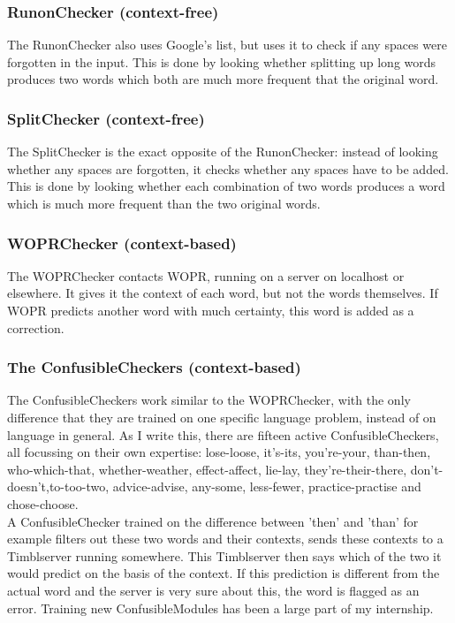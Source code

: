 \documentclass[12pt]{article}
\begin{document}
\subsubsection{RunonChecker (context-free)}
The RunonChecker also uses Google's list, but uses it to check if any spaces were forgotten in the input. This is done by looking whether splitting up long words produces two words which both are much more frequent that the original word.

\subsubsection{SplitChecker (context-free)}
The SplitChecker is the exact opposite of the RunonChecker: instead of looking whether any spaces are forgotten, it checks whether any spaces have to be added. This is done by looking whether each combination of two words produces a word which is much more frequent than the two original words.

\subsubsection{WOPRChecker (context-based)}
The WOPRChecker contacts WOPR, running on a server on localhost or elsewhere. It gives it the context of each word, but not the words themselves. If WOPR predicts another word with much certainty, this word is added as a correction.  

\subsubsection{The ConfusibleCheckers (context-based)}
The ConfusibleCheckers work similar to the WOPRChecker, with the only difference that they are trained on one specific language problem, instead of on language in general. As I write this, there are fifteen active ConfusibleCheckers, all focussing on their own expertise: lose-loose, it's-its, you're-your, than-then, who-which-that, whether-weather, effect-affect, lie-lay, they're-their-there, don't-doesn't,to-too-two, advice-advise, any-some, less-fewer, practice-practise and chose-choose.
\\\indent
A ConfusibleChecker trained on the difference between 'then' and 'than' for example filters out these two words and their contexts, sends these contexts to a Timblserver running somewhere. This Timblserver then says which of the two it would predict on the basis of the context. If this prediction is different from the actual word and the server is very sure about this, the word is flagged as an error. Training new ConfusibleModules has been a large part of my internship.
\end{document}
